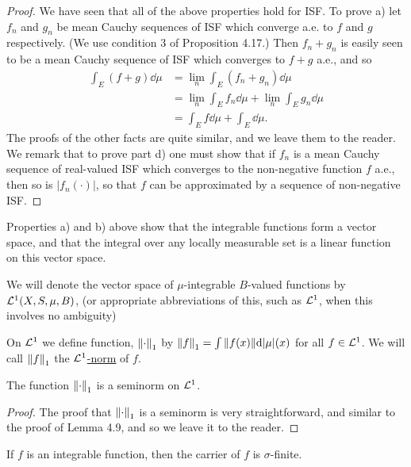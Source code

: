 \begin{proof}
We have seen that all of the above properties hold for ISF. To prove a) let $f_n$ and $g_n$ be mean Cauchy sequences of ISF which converge a.e. to $f$ and $g$ respectively. (We use condition 3 of Proposition 4.17.) Then $f_n+g_n$ is easily seen to be a mean Cauchy sequence of ISF which converges to $f+g$ a.e., and so
\begin{align*}
    \int_E(f+g)\dd\mu&=\lim_n\int_E(f_n+g_n)\dd\mu\\
    &=\lim_n\int_Ef_n\dd\mu+\lim_n\int_Eg_n\dd\mu\\
    &=\int_Ef\dd\mu+\int_E\dd\mu.
\end{align*}
The proofs of the other facts are quite similar, and we leave them to the reader. We remark that to prove part d) one must show that if $f_n$ is a mean Cauchy sequence of real-valued ISF which converges to the non-negative function $f$ a.e., then so is $|f_n(\cdot)|$, so that $f$ can be approximated by a sequence of non-negative ISF.
\end{proof}

Properties a) and b) above show that the integrable functions form a vector space, and that the integral over any locally measurable set is a linear function on this vector space.

\begin{definition}
We will denote the vector space of $\mu$-integrable $B$-valued functions by ${\cal L}^1(X,S,\mu,B)$, (or appropriate abbreviations of this, such as ${\cal L}^1$, when this involves no ambiguity)
\end{definition}

\begin{definition}
On ${\cal L}^1$ we define function, $\norm{\cdot}_1$ by $\norm{f}_1=\int\norm{f(x)}\dd|\mu|(x)$ for all $f\in{\cal L}^1$. We will call $\norm{f}_1$ the \underline{${\cal L}^1$-norm} of $f$.
\end{definition}

\begin{proposition}
The function $\norm{\cdot}_1$ is a seminorm on ${\cal L}^1$.
\end{proposition}

\begin{proof}
The proof that $\norm{\cdot}_1$ is a seminorm is very straightforward, and similar to the proof of Lemma 4.9, and so we leave it to the reader.
\end{proof}

\begin{proposition}
If $f$ is an integrable function, then the carrier of $f$ is $\sigma$-finite.
\end{proposition}

